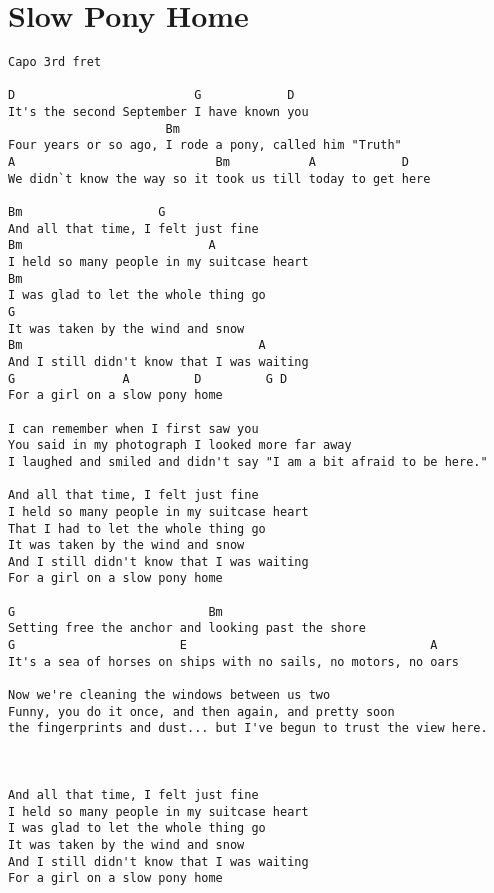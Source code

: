 \documentclass[leqno]{memoir}
\begin{document}
\chapter{Slow Pony Home}
\begin{verbatim}
Capo 3rd fret

D                         G            D
It's the second September I have known you
                      Bm
Four years or so ago, I rode a pony, called him "Truth" 
A                            Bm           A            D
We didn`t know the way so it took us till today to get here

Bm                   G
And all that time, I felt just fine
Bm                          A
I held so many people in my suitcase heart
Bm
I was glad to let the whole thing go 
G
It was taken by the wind and snow
Bm                                 A
And I still didn't know that I was waiting 
G               A         D         G D
For a girl on a slow pony home 

I can remember when I first saw you
You said in my photograph I looked more far away
I laughed and smiled and didn't say "I am a bit afraid to be here." 

And all that time, I felt just fine
I held so many people in my suitcase heart
That I had to let the whole thing go 
It was taken by the wind and snow
And I still didn't know that I was waiting 
For a girl on a slow pony home 

G                           Bm
Setting free the anchor and looking past the shore
G                       E                                  A
It's a sea of horses on ships with no sails, no motors, no oars

Now we're cleaning the windows between us two 
Funny, you do it once, and then again, and pretty soon 
the fingerprints and dust... but I've begun to trust the view here.



And all that time, I felt just fine
I held so many people in my suitcase heart
I was glad to let the whole thing go 
It was taken by the wind and snow
And I still didn't know that I was waiting 
For a girl on a slow pony home 
\end{verbatim}
\newpage
\end{document}
